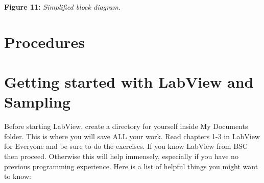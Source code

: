 \documentclass{../lab}
\begin{document}
\textbf{Figure 11:} \emph{Simplified block diagram.}\section{Procedures}

\section{Getting started with LabView and Sampling}

Before starting LabView, create a directory for yourself inside My Documents folder. This is where you will save ALL your work. Read chapters 1-3 in LabView for Everyone and be sure to do the exercises. If you know LabView from BSC then proceed. Otherwise this will help immensely, especially if you have no previous programming experience. Here is a list of helpful things you might want to know:
\end{document}
